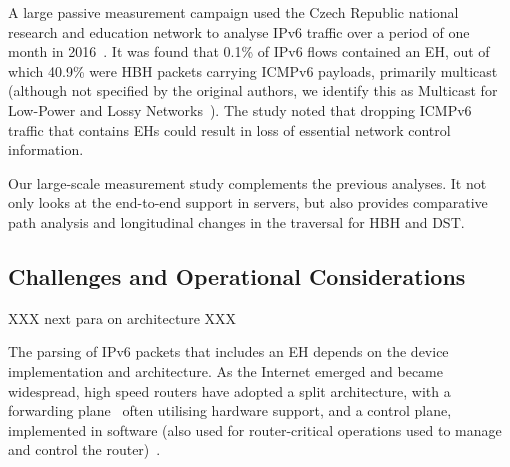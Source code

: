 \documentclass[conference]{IEEEtran}
\begin{document}

A large passive measurement campaign used the Czech Republic national
research and education network to analyse IPv6 traffic over a period of one month in
2016~\cite{passive-threats}. It was found that 0.1\% of IPv6 flows
contained an EH, out of which 40.9\% were HBH packets carrying ICMPv6
payloads, primarily multicast (although not specified by the original authors,
we identify this as Multicast for Low-Power and Lossy Networks~\cite{RFC7731}).
The study noted that dropping ICMPv6 traffic that contains EHs could result in
loss of essential network control information. 


Our large-scale measurement study complements the previous analyses. It not only
looks at the end-to-end support in servers, but also provides comparative path
analysis and longitudinal changes in the traversal for HBH and DST.

\subsection{Challenges and Operational Considerations}

XXX next para on architecture XXX

The parsing of IPv6 packets that includes an EH depends on 
the device implementation and
architecture. As the Internet emerged and became widespread, high speed routers have adopted a split architecture, 
with a forwarding plane~\cite{RFC3654} often utilising hardware support, and a control plane, implemented in software (also used for router-critical operations used to manage and control the router)~\cite{router-architecture}.
\end{document}
